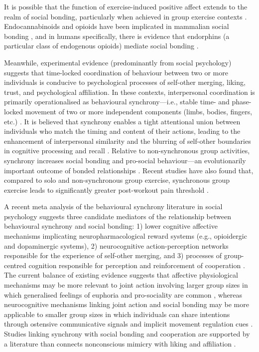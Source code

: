 \begin{CJK}{UTF8}{gbsn}
It is possible that the function of exercise-induced positive affect extends to the realm of social bonding, particularly when achieved in group exercise contexts \citep{Cohen2009,Machin2011}.  Endocannabinoids and opioids have been implicated in mammalian social bonding \citep{Fattore2010,Keverne1989}, and in humans specifically, there is evidence that endorphins (a particular class of endogenous opioids) mediate social bonding \citep{Dunbar2012,Shultz2010}.

Meanwhile, experimental evidence (predominantly from social psychology) suggests that time-locked coordination of behaviour between two or more individuals is conducive to psychological processes of self-other merging, liking, trust, and psychological affiliation.  In these contexts, interpersonal coordination is primarily operationalised as behavioural synchrony---i.e., stable time- and phase-locked movement of two or more independent components (limbs, bodies, fingers, etc.) \citep{Pikovsky2007}. It is believed that synchrony enables a tight attentional union between individuals who match the timing and content of their actions, leading to the enhancement of interpersonal similarity and the blurring of self-other boundaries in cognitive processing and recall \citep{Cohen2017}.  Relative to non-synchronous group activities, synchrony increases social bonding and pro-social behaviour---an evolutionarily important outcome of bonded relationships \citep{Reddish2013,Reddish2013a,Wiltermuth2009}.  Recent studies have also found that, compared to solo and non-synchronous group exercise, synchronous group exercise leads to significantly greater post-workout pain threshold \citep{Cohen2009,Sullivan2014,Sullivan2013a, Sullivan2013b}.

A recent meta analysis of the behavioural synchrony literature in social psychology suggests three candidate mediators of the relationship between behavioural synchrony and social bonding: 1) lower cognitive affective mechanisms implicating neuropharmacological reward systems (e.g., opioidergic and dopaminergic systems), 2) neurocognitive action-perception networks responsible for the experience of self-other merging, and 3) processes of group-centred cognition responsible for perception and reinforcement of cooperation \citep{Mogan2017}.  The current balance of existing evidence suggests that affective physiological mechanisms may be more relevant to joint action involving larger group sizes in which generalised feelings of euphoria and pro-sociality are common \citep[e.g., mass religious rituals or music festivals, see][]{Weinstein2016}, whereas neurocognitive mechanisms linking joint action and social bonding may be more applicable to smaller group sizes in which individuals can share intentions through ostensive communicative signals and implicit movement regulation cues \citep{Semin2008,Frith2010}.  Studies linking synchrony with social bonding and cooperation are supported by a literature than connects nonconscious mimicry with liking and affiliation \citep{VanBaaren2009}.


\end{CJK}
